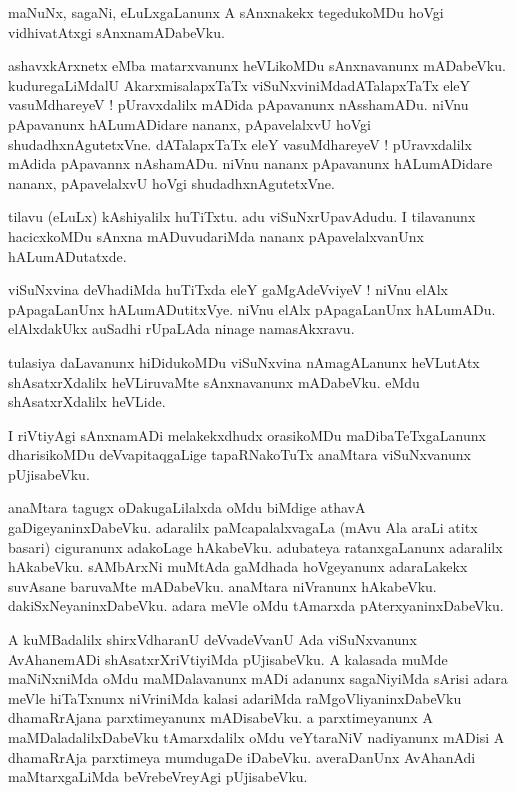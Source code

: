 \documentclass{article}
\begin{document}
\begin{mn}%
maNuNx, sagaNi, eLuLxgaLanunx A sAnxnakekx tegedukoMDu hoVgi vidhivatAtxgi sAnxnamADabeVku.
\end{mn}

\begin{mn}%
ashavxkArxnetx eMba matarxvanunx heVLikoMDu sAnxnavanunx mADabeVku. kuduregaLiMdalU 
AkarxmisalapxTaTx viSuNxviniMdadATalapxTaTx eleY vasuMdhareyeV ! pUravxdalilx mADida pApavanunx 
nAsshamADu. niVnu pApavanunx hALumADidare nananx, pApavelalxvU hoVgi shudadhxnAgutetxVne. 
dATalapxTaTx eleY vasuMdhareyeV ! pUravxdalilx mAdida pApavannx nAshamADu. niVnu nananx pApavanunx 
hALumADidare nananx, pApavelalxvU hoVgi shudadhxnAgutetxVne.
\end{mn}

\begin{mn}%
tilavu (eLuLx) kAshiyalilx huTiTxtu. adu viSuNxrUpavAdudu. I tilavanunx hacicxkoMDu sAnxna 
mADuvudariMda nananx pApavelalxvanUnx hALumADutatxde.
\end{mn}

\begin{mn}%
viSuNxvina deVhadiMda huTiTxda eleY gaMgAdeVviyeV ! niVnu elAlx pApagaLanUnx hALumADutitxVye. niVnu 
elAlx pApagaLanUnx hALumADu. elAlxdakUkx auSadhi rUpaLAda ninage namasAkxravu.
\end{mn}

\begin{mn}%
tulasiya daLavanunx hiDidukoMDu viSuNxvina nAmagALanunx heVLutAtx shAsatxrXdalilx heVLiruvaMte 
sAnxnavanunx mADabeVku. eMdu shAsatxrXdalilx heVLide.
\end{mn}

\begin{mn}%
I riVtiyAgi sAnxnamADi melakekxdhudx orasikoMDu maDibaTeTxgaLanunx dharisikoMDu deVvapitaqgaLige 
tapaRNakoTuTx anaMtara viSuNxvanunx pUjisabeVku.
\end{mn}

\begin{mn}%
anaMtara tagugx oDakugaLilalxda oMdu biMdige athavA gaDigeyaninxDabeVku. adaralilx 
paMcapalalxvagaLa (mAvu Ala araLi atitx basari) ciguranunx adakoLage hAkabeVku. adubateya 
ratanxgaLanunx adaralilx hAkabeVku. sAMbArxNi muMtAda gaMdhada hoVgeyanunx adaraLakekx suvAsane 
baruvaMte mADabeVku. anaMtara niVranunx hAkabeVku. dakiSxNeyaninxDabeVku. adara meVle oMdu 
tAmarxda pAterxyaninxDabeVku.
\end{mn}

\begin{mn}%
A kuMBadalilx shirxVdharanU deVvadeVvanU Ada viSuNxvanunx AvAhanemADi shAsatxrXriVtiyiMda 
pUjisabeVku. A kalasada muMde maNiNxniMda oMdu maMDalavanunx mADi adanunx sagaNiyiMda sArisi adara 
meVle hiTaTxnunx niVriniMda kalasi adariMda raMgoVliyaninxDabeVku dhamaRrAjana parxtimeyanunx 
mADisabeVku. a parxtimeyanunx A maMDaladalilxDabeVku tAmarxdalilx oMdu veYtaraNiV nadiyanunx 
mADisi A dhamaRrAja parxtimeya mumdugaDe iDabeVku. averaDanUnx AvAhanAdi maMtarxgaLiMda 
beVrebeVreyAgi pUjisabeVku.
\end{mn}
\end{document}
